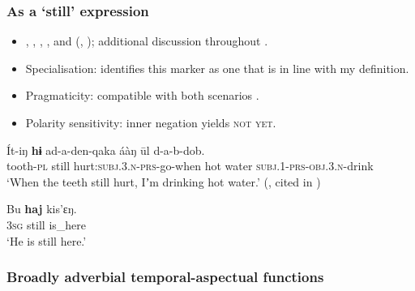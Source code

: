\subsubsection{As a \lq{}still\rq{ }expression}
\begin{itemize}
	\item \textcite[45]{Donner1955}, \textcite[144]{Georg2007}, \textcite[177]{KotorovaNefedov2015}, \textcite[41]{Vajda2004}, and \citeauthor{Werner1997} (\citeyear[71, 145]{Werner1997}, \citeyear[292]{Werner2002}); additional discussion throughout \textcite{vanBaar1997}.
	\item Specialisation: \textcite{vanBaar1997} identifies this marker as one that is in line with my definition. 
	\item Pragmaticity: compatible with both scenarios \parencite[76–77]{vanBaar1997}.
	\item Polarity sensitivity: inner negation yields \textsc{not yet}.
\end{itemize}

\begin{exe}
	\ex
	\gll Ít-iŋ \textbf{hɨ} ad-a-den-qaka áàŋ ūl d-a-b-dob.\\
	tooth-\textsc{pl} still hurt:\textsc{subj}.3.\textsc{n}-\textsc{prs}-go-when hot water \textsc{subj}.1-\textsc{prs}-\textsc{obj}.3.\textsc{n}-drink\\
	\glt \lq When the teeth still hurt, Iʼm drinking hot water.\rq{ }(\cite[90]{Grishina1979}, cited in \cite[193]{Nefedov2015})

	\ex
	\gll Bu \textbf{haj} kis'ɛŋ.\\
	3\textsc{sg} still is\_here\\
	\glt \lq He is still here.' \parencite[306]{vanBaar1997}
\end{exe}

\subsubsection{Broadly adverbial temporal-aspectual functions}

